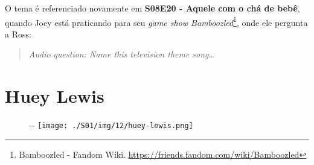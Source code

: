 O tema é referenciado novamente em
\textbf{\textcolor{primarycolor}{S08E20 - Aquele com o chá de bebê}},
quando Joey está praticando para seu \emph{game show
Bamboozled}\footnote{\sloppy Bamboozled - Fandom Wiki. \url{https://friends.fandom.com/wiki/Bamboozled}},
onde ele pergunta a Ross:

\begin{quote}
\emph{Audio question: Name this television theme song\ldots{}}
\end{quote}

\hypertarget{huey-lewis}{%
\section{Huey Lewis}\label{huey-lewis}}

\begin{figure}[!ht]
  \begin{adjustwidth}{-\oddsidemargin-1in}{-\rightmargin}
    \centering
    \texttt{[image: ./S01/img/12/huey-lewis.png]}
  \end{adjustwidth}
\end{figure}

